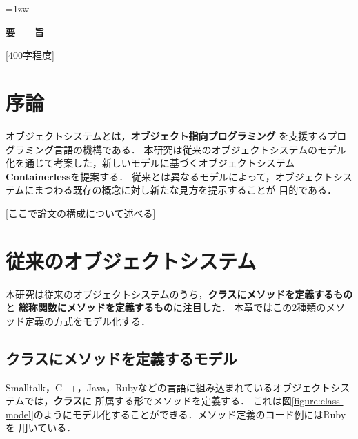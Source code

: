 \documentclass[a4paper,11pt,dvipdfmx]{jreport}
\title{\Underline{Containerless：オブジェクトシステムの新しいとらえ方}}
\author{林 拓人}
\begin{document}
\maketitle
\thispagestyle{empty}
\newpage

\thispagestyle{empty}
\vspace*{20pt plus 1fil}
\parindent=1zw
\noindent
\begin{center}
{\Large \bf 要　　旨}
\vspace{2cm}
\end{center}
[400字程度]

\par
\vspace{0pt plus 1fil}
\newpage

\tableofcontents
\listoffigures

\pagebreak \setcounter{page}{1}


\chapter{序論}

オブジェクトシステムとは，\textbf{オブジェクト指向プログラミング}\cite{Stroustrup:1988:OP:624569.624721}
を支援するプログラミング言語の機構である．
本研究は従来のオブジェクトシステムのモデル化を通じて考案した，新しいモデルに基づくオブジェクトシステム
\textbf{Containerless}を提案する．
従来とは異なるモデルによって，オブジェクトシステムにまつわる既存の概念に対し新たな見方を提示することが
目的である．

[ここで論文の構成について述べる]


\chapter{従来のオブジェクトシステム}

本研究は従来のオブジェクトシステムのうち，\textbf{クラスにメソッドを定義するもの}と
\textbf{総称関数にメソッドを定義するもの}に注目した．
本章ではこの2種類のメソッド定義の方式をモデル化する．

\section{クラスにメソッドを定義するモデル}

Smalltalk，C++，Java，Rubyなどの言語に組み込まれているオブジェクトシステムでは，\textbf{クラス}に
所属する形でメソッドを定義する．
これは図\ref{figure:class-model}のようにモデル化することができる．メソッド定義のコード例にはRubyを
用いている．
\end{document}
